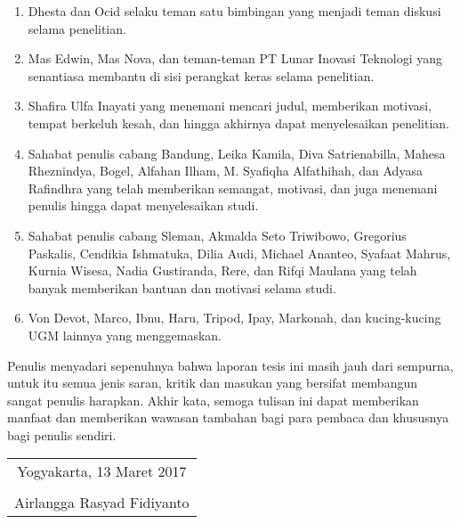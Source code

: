 \begin{enumerate}
	\item Dhesta dan Ocid selaku teman satu bimbingan yang menjadi teman diskusi selama penelitian.
	
	\item Mas Edwin, Mas Nova, dan teman-teman PT Lunar Inovasi Teknologi yang senantiasa membantu di sisi perangkat keras selama penelitian.
	
	\item Shafira Ulfa Inayati yang menemani mencari judul, memberikan motivasi, tempat berkeluh kesah, dan hingga akhirnya dapat menyelesaikan penelitian.
	
	\item Sahabat penulis cabang Bandung, Leika Kamila, Diva Satrienabilla, Mahesa Rheznindya, Bogel, Alfahan Ilham, M. Syafiqha Alfathihah, dan Adyasa Rafindhra yang telah memberikan semangat, motivasi, dan juga menemani penulis hingga dapat menyelesaikan studi.
	
	\item Sahabat penulis cabang Sleman, Akmalda Seto Triwibowo, Gregorius Paskalis, Cendikia Ishmatuka, Dilia Audi, Michael Ananteo, Syafaat Mahrus, Kurnia Wisesa, Nadia Gustiranda, Rere, dan Rifqi Maulana yang telah banyak memberikan bantuan dan motivasi selama studi.
	
	\item Von Devot, Marco, Ibnu, Haru, Tripod, Ipay, Markonah, dan kucing-kucing UGM lainnya yang menggemaskan.

\end{enumerate}

Penulis menyadari sepenuhnya bahwa laporan tesis ini masih jauh dari sempurna, untuk itu semua jenis saran, kritik dan masukan yang bersifat membangun sangat penulis harapkan. Akhir kata, semoga tulisan ini dapat memberikan manfaat dan memberikan wawasan tambahan bagi para pembaca dan khususnya bagi penulis sendiri.

\begin{flushright}
	\begin{tabular}{c}
		Yogyakarta, 13 Maret 2017 \\
		\vspace{1cm} \\
		Airlangga Rasyad Fidiyanto
	\end{tabular}
\end{flushright}